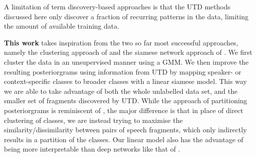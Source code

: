 A limitation of term discovery-based approaches is that the UTD methods discussed here only discover a fraction of recurring patterns in the data, limiting the amount of available training data.

\textbf{This work}
takes inspiration from the two so far most successful approaches, namely the clustering approach of \parencite{chen2015parallel} and the siamese network approach of \parencite{thiolliere2015hybrid}.
We first cluster the data in an unsupervised manner using a GMM.
We then improve the resulting posteriorgrams using information from UTD by mapping speaker- or context-specific classes to broader classes with a linear siamese model.
This way we are able to take advantage of both the whole unlabelled data set, and the smaller set of fragments discovered by UTD.
While the approach of partitioning posteriorgrams is reminiscent of \parencite{jansen2013weak}, the major difference is that in place of direct clustering of classes, we are instead trying to maximise the similarity/dissimilarity between pairs of speech fragments, which only indirectly results in a partition of the classes.
Our linear model also has the advantage of being more interpretable than deep networks like that of \parencite{thiolliere2015hybrid}.


